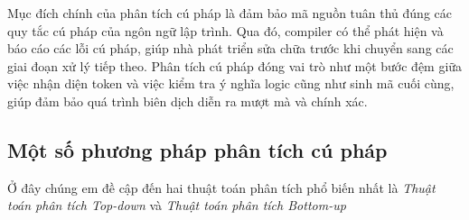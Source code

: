 





\vspace{1cm}

Mục đích chính của phân tích cú pháp là đảm bảo mã nguồn tuân thủ đúng các quy tắc cú pháp của ngôn ngữ lập trình. Qua đó, compiler có thể phát hiện và báo cáo các lỗi cú pháp, giúp nhà phát triển sửa chữa trước khi chuyển sang các giai đoạn xử lý tiếp theo. Phân tích cú pháp đóng vai trò như một bước đệm giữa việc nhận diện token và việc kiểm tra ý nghĩa logic cũng như sinh mã cuối cùng, giúp đảm bảo quá trình biên dịch diễn ra mượt mà và chính xác.
\subsection{Một số phương pháp phân tích cú pháp}
Ở đây chúng em đề cập đến hai thuật toán phân tích phổ biến nhất là \textit{Thuật toán phân tích Top-down} và \textit{Thuật toán phân tích Bottom-up}

